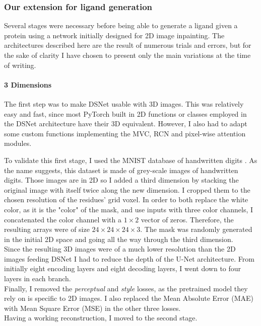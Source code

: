 \documentclass{article}
\begin{document}
\subsubsection{Our extension for ligand generation}
\label{sec:ext}

Several stages were necessary before being able to generate a ligand given a protein using a network initially designed for 2D image inpainting. The architectures described here are the result of numerous trials and errors, but for the sake of clarity I have chosen to present only the main variations at the time of writing.

\paragraph{3 Dimensions}
The first step was to make DSNet usable with 3D images. This was relatively easy and fast, since most PyTorch built in 2D functions or classes employed in the DSNet architecture have their 3D equivalent. However, I also had to adapt some custom functions implementing the MVC, RCN and pixel-wise attention modules.

To validate this first stage, I used the MNIST database of handwritten digits \cite{mnist}. As the name suggests, this dataset is made of grey-scale images of handwritten digits. Those images are in 2D so I added a third dimension by stacking the original image with itself twice along the new dimension. I cropped them to the chosen resolution of the residues' grid voxel. In order to both replace the white color, as it is the "color" of the mask, and use inputs with three color channels, I concatenated the color channel with a $1\times2$ vector of zeros. Therefore, the resulting arrays were of size $24\times24\times24\times3$. The mask was randomly generated in the initial 2D space and going all the way through the third dimension. \\
Since the resulting 3D images were of a much lower resolution than the 2D images feeding DSNet I had to reduce the depth of the U-Net architecture. From initially eight encoding layers and eight decoding layers, I went down to four layers in each branch. \\
Finally, I removed the \textit{perceptual} and \textit{
style} losses, as the pretrained model they rely on is specific to 2D images. I also replaced the Mean Absolute Error (MAE) with Mean Square Error (MSE) in the other three losses. \\
\phantom{\quad} Having a working reconstruction, I moved to the second stage.
\end{document}
